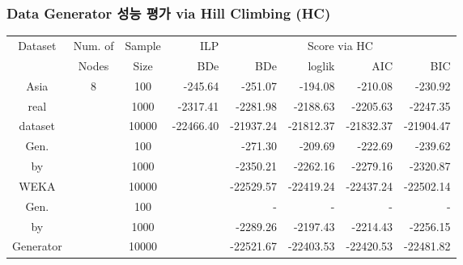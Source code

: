 \documentclass{beamer}
\begin{document}
\begin{frame}
\frametitle{Data Generator 성능 평가 via Hill Climbing (HC)}
{\scriptsize{}
\begin{center}

\begin{tabular}{c|c|c|r|r|r|r|r}
\hline 
\multirow{2}{*}{{\tiny{}Dataset}} & {\tiny{}Num. of} & {\tiny{}Sample} & {\tiny{}ILP} & \multicolumn{4}{c}{{\tiny{}Score via HC}}\tabularnewline
\cline{4-8} 
 & {\tiny{}Nodes} & {\tiny{}Size} & {\tiny{}BDe} & {\tiny{}BDe} & {\tiny{}loglik} & {\tiny{}AIC} & {\tiny{}BIC}\tabularnewline
\hline 
{\tiny{}Asia} & \multirow{9}{*}{{\tiny{}8}} & {\tiny{}100} & {\tiny{}-245.64} & {\tiny{}-251.07} & {\tiny{}-194.08} & {\tiny{}-210.08} & {\tiny{}-230.92}\tabularnewline
{\tiny{}real} &  & {\tiny{}1000} & {\tiny{}-2317.41} & {\tiny{}-2281.98} & {\tiny{}-2188.63} & {\tiny{}-2205.63} & {\tiny{}-2247.35}\tabularnewline
{\tiny{}dataset} &  & {\tiny{}10000} & {\tiny{}-22466.40} & {\tiny{}-21937.24} & {\tiny{}-21812.37} & {\tiny{}-21832.37} & {\tiny{}-21904.47}\tabularnewline
\cline{1-1} \cline{3-8} 
{\tiny{}Gen.} &  & {\tiny{}100} &  & {\tiny{}-271.30} & {\tiny{}-209.69} & {\tiny{}-222.69} & {\tiny{}-239.62}\tabularnewline
{\tiny{}by} &  & {\tiny{}1000} &  & {\tiny{}-2350.21} & {\tiny{}-2262.16} & {\tiny{}-2279.16} & {\tiny{}-2320.87}\tabularnewline
{\tiny{}WEKA} &  & {\tiny{}10000} &  & {\tiny{}-22529.57} & {\tiny{}-22419.24} & {\tiny{}-22437.24} & {\tiny{}-22502.14}\tabularnewline
\cline{1-1} \cline{3-8} 
{\tiny{}Gen.} &  & {\tiny{}100} &  & {\tiny{}-} & {\tiny{}-} & {\tiny{}-} & {\tiny{}-}\tabularnewline
{\tiny{}by} &  & {\tiny{}1000} &  & {\tiny{}-2289.26} & {\tiny{}-2197.43} & {\tiny{}-2214.43} & {\tiny{}-2256.15}\tabularnewline
{\tiny{}Generator} &  & {\tiny{}10000} &  & {\tiny{}-22521.67} & {\tiny{}-22403.53} & {\tiny{}-22420.53} & {\tiny{}-22481.82}\tabularnewline
\hline 
\end{tabular}

\end{center}
}
\end{frame}
\end{document}

